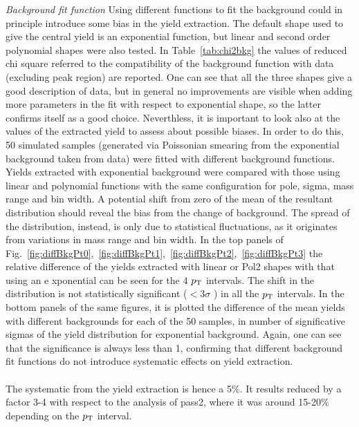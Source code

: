 \emph{Background fit function}
Using different functions to fit the background could in 
principle introduce some bias in the yield extraction. 
The default shape used to give the central yield is an 
exponential function, but linear and second 
order polynomial shapes were also tested. In Table~\ref{tab:chi2bkg} 
the values of reduced chi square referred to the compatibility 
of the background function with data (excluding peak region) are 
reported. One can see that all the three shapes 
give a good description of data, but in general no improvements 
are visible when adding more parameters in the fit
with respect to exponential shape, so the latter confirms itself as a good choice.
Neverthless, it is important to look also at the values of the 
extracted yield to assess about possible biases.
 In order to do this, 50 simulated samples (generated via 
 Poissonian smearing from
the exponential background taken from data) were fitted
 with different background functions. Yields extracted with exponential 
 background were compared with those using linear and 
 polynomial functions with the same
configuration for pole, sigma, mass range and bin width. 
A potential shift from zero of the mean of the resultant distribution 
 should reveal the bias from the change of background. The
  spread of the distribution, instead, is only due to statistical fluctuations,
 as it originates from variations in mass range and bin width. In the 
 top panels of Fig.~\ref{fig:diffBkgPt0},~\ref{fig:diffBkgPt1},~\ref{fig:diffBkgPt2},~\ref{fig:diffBkgPt3} 
 the relative difference of the yields 
 extracted with linear or Pol2 shapes with that using an e
 xponential can be seen for the 4 $p_{\rm T}$ intervals.
 The shift in the distribution is not statistically significant 
 ($< 3\sigma$ ) in all the $p_{\rm T}$ intervals. 
 In the bottom panels of the same figures, it is plotted the 
 difference of the mean yields with different
backgrounds for each of the 50 samples, in number of significative 
sigmas of the yield distribution for exponential background.
 Again, one can see that the significance is always less than 1, 
 confirming that different
background fit functions do not introduce systematic 
effects on yield extraction.\\
 \\
The systematic from the yield extraction is hence a 5\%. 
It results reduced by a factor 3-4 with respect to the analysis of pass2,
where it was around 15-20\% depending on the $p_{\rm T}$ interval. 

